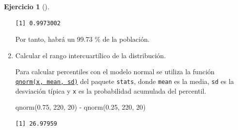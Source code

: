 \documentclass[
  a4paper,
]{scrreport}
\newenvironment{Shaded}{\begin{snugshade}}{\end{snugshade}}
\newcommand{\DecValTok}[1]{\textcolor[rgb]{0.68,0.00,0.00}{#1}}
\newcommand{\FloatTok}[1]{\textcolor[rgb]{0.68,0.00,0.00}{#1}}
\newcommand{\FunctionTok}[1]{\textcolor[rgb]{0.28,0.35,0.67}{#1}}
\newcommand{\NormalTok}[1]{\textcolor[rgb]{0.00,0.23,0.31}{#1}}
\newcommand{\SpecialCharTok}[1]{\textcolor[rgb]{0.37,0.37,0.37}{#1}}
\theoremstyle{definition}
\newtheorem{exercise}{Ejercicio}[chapter]
\theoremstyle{remark}
\begin{document}
\begin{exercise}[]
\begin{enumerate}
\begin{tcolorbox}
\begin{verbatim}
[1] 0.9973002
\end{verbatim}

  Por tanto, habrá un 99.73 \% de la población.

  \end{tcolorbox}
\item
  Calcular el rango intercuartílico de la distribución.

  \begin{tcolorbox}[enhanced jigsaw, toprule=.15mm, rightrule=.15mm, arc=.35mm, colback=white, colbacktitle=quarto-callout-tip-color!10!white, toptitle=1mm, left=2mm, colframe=quarto-callout-tip-color-frame, opacityback=0, breakable, opacitybacktitle=0.6, bottomtitle=1mm, titlerule=0mm, title=\textcolor{quarto-callout-tip-color}{\faLightbulb}\hspace{0.5em}{Solución}, bottomrule=.15mm, coltitle=black, leftrule=.75mm]

  Para calcular percentiles con el modelo normal se utiliza la función
  \href{https://www.rdocumentation.org/packages/stats/versions/3.3/topics/Normal}{\texttt{qnorm(x,\ mean,\ sd)}}
  del paquete \texttt{stats}, donde \texttt{mean} es la media,
  \texttt{sd} es la desviación típica y \texttt{x} es la probabilidad
  acumulada del percentil.

\begin{Shaded}
\begin{Highlighting}[]
\FunctionTok{qnorm}\NormalTok{(}\FloatTok{0.75}\NormalTok{, }\DecValTok{220}\NormalTok{, }\DecValTok{20}\NormalTok{) }\SpecialCharTok{{-}} \FunctionTok{qnorm}\NormalTok{(}\FloatTok{0.25}\NormalTok{, }\DecValTok{220}\NormalTok{, }\DecValTok{20}\NormalTok{)}
\end{Highlighting}
\end{Shaded}

\begin{verbatim}
[1] 26.97959
\end{verbatim}

  \end{tcolorbox}
\end{enumerate}

\end{exercise}
\end{document}
